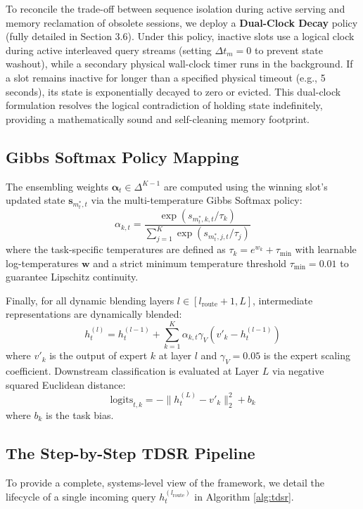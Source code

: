\begin{itemize}
    To reconcile the trade-off between sequence isolation during active serving and memory reclamation of obsolete sessions, we deploy a \textbf{Dual-Clock Decay} policy (fully detailed in Section 3.6). Under this policy, inactive slots use a logical clock during active interleaved query streams (setting $\Delta t_m = 0$ to prevent state washout), while a secondary physical wall-clock timer runs in the background. If a slot remains inactive for longer than a specified physical timeout (e.g., 5 seconds), its state is exponentially decayed to zero or evicted. This dual-clock formulation resolves the logical contradiction of holding state indefinitely, providing a mathematically sound and self-cleaning memory footprint.
\end{itemize}

\subsection{Gibbs Softmax Policy Mapping}
The ensembling weights $\boldsymbol{\alpha}_t \in \Delta^{K-1}$ are computed using the winning slot's updated state $\mathbf{s}_{m^*_t, t}$ via the multi-temperature Gibbs Softmax policy:
\begin{equation}
\alpha_{k, t} = \frac{\exp(s_{m^*_t, k, t}/\tau_k)}{\sum_{j=1}^K \exp(s_{m^*_t, j, t}/\tau_j)}
\end{equation}
where the task-specific temperatures are defined as $\tau_k = e^{w_k} + \tau_{\min}$ with learnable log-temperatures $\mathbf{w}$ and a strict minimum temperature threshold $\tau_{\min} = 0.01$ to guarantee Lipschitz continuity.

Finally, for all dynamic blending layers $l \in [l_{\text{route}} + 1, L]$, intermediate representations are dynamically blended:
\begin{equation}
h_t^{(l)} = h_t^{(l-1)} + \sum_{k=1}^K \alpha_{k, t} \gamma_V (v'_k - h_t^{(l-1)})
\end{equation}
where $v'_k$ is the output of expert $k$ at layer $l$ and $\gamma_V = 0.05$ is the expert scaling coefficient. Downstream classification is evaluated at Layer $L$ via negative squared Euclidean distance:
\begin{equation}
\text{logits}_{t, k} = - \| h_t^{(L)} - v'_k \|_2^2 + b_k
\end{equation}
where $b_k$ is the task bias.

\subsection{The Step-by-Step TDSR Pipeline}
To provide a complete, systems-level view of the framework, we detail the lifecycle of a single incoming query $h_t^{(l_{\text{route}})}$ in Algorithm \ref{alg:tdsr}.

